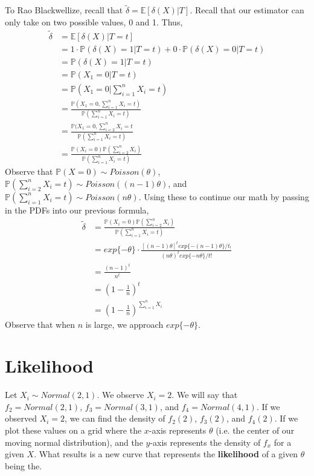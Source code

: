 \documentclass[titlepage, 12pt, leqno]{article}
\begin{document}
To Rao Blackwellize, recall that $\tilde{\delta} = \mathbb{E}[\delta(X)|T]$.
Recall that our estimator can only take on two possible values, 0 and 1. Thus,
\begin{align*}
    \tilde{\delta} &= \mathbb{E}[\delta(X)|T=t] \\
                   &= 1 \cdot \mathbb{P}(\delta(X) = 1 |T=t) + 0 \cdot
                   \mathbb{P}(\delta(X) = 0|T=t) \\
                   &= \mathbb{P}(\delta(X) = 1 | T=t) \\
                   &= \mathbb{P}(X_{1} = 0 | T=t) \\
                   &= \mathbb{P}(X_{1} = 0 | \sum_{i=1}^{n}X_{i} = t) \\
                   &= \frac{\mathbb{P}(X_{1}=0, \sum_{i=1}^{n}X_{i} = t)}
                   {\mathbb{P}(\sum_{i=1}^{n}X_{i}=t)} \\
                   &= \frac{\mathbb{P}(X_{1}=0, \sum_{i=2}^{n}X_{i}=t}{
                   \mathbb{P}(\sum_{i=1}^{n}X_{i}=t)} \\
                   &= \frac{\mathbb{P}(X_{i} =0) \mathbb{P}(\sum_{i=2}^{n}X_{i})}
                   {\mathbb{P}(\sum_{i=1}^{n}X_{i}=t)}
\end{align*}
Observe that $\mathbb{P}(X=0) \sim Poisson(\theta)$, 
$\mathbb{P}(\sum_{i=2}^{n}X_{i}=t) \sim Poisson((n-1)\theta)$, and \\
$\mathbb{P}(\sum_{i=1}^{n}X_{i}=t) \sim Poisson(n\theta)$. Using these to 
continue our math by passing in the PDFs into our previous formula,
\begin{align*}
\tilde{\delta} &= \frac{\mathbb{P}(X_{i} =0)
\mathbb{P}(\sum_{i=2}^{n}X_{i})}{\mathbb{P}(\sum_{i=1}^{n}X_{i}=t)} \\
               &= exp\{-\theta\} \cdot \frac{[(n-1)\theta]^{t}
               exp\{-(n-1)\theta\} / t_{!}}{(n\theta)^{t}exp\{-n\theta\}/t!}
               \\
               &= \frac{(n-1)^{t}}{n^{t}} \\
               &= (1 - \frac{1}{n})^{t} \\
               &= (1 - \frac{1}{n})^{\sum_{i=1}^{n}X_{i}}
\end{align*}
Observe that when $n$ is large, we approach $exp\{-\theta\}$.

\pagebreak

\section{Likelihood}
Let $X_{i} \sim Normal(2, 1)$. We observe $X_{i} = 2$. We will say that
$f_{2} = Normal(2, 1)$, $f_{3} = Normal(3, 1)$, and $f_{4} = Normal(4,1)$. If
we observed $X_{i}=2$, we can find the density of $f_{2}(2)$, $f_{3}(2)$, and
$f_{4}(2)$. If we plot these values on a grid where the $x$-axis represents
$\theta$ (i.e. the center of our moving normal distribution), and the $y$-axis
represents the density of $f_{x}$ for a given $X$. What results is a new curve
that represents the \textbf{likelihood} of a given $\theta$ being the.
\end{document}
